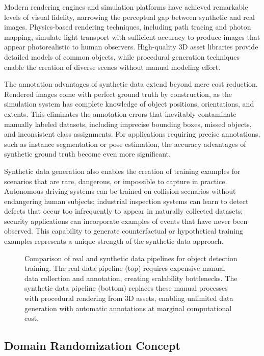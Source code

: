 Modern rendering engines and simulation platforms have achieved remarkable levels of visual fidelity, narrowing the perceptual gap between synthetic and real images. Physics-based rendering techniques, including path tracing and photon mapping, simulate light transport with sufficient accuracy to produce images that appear photorealistic to human observers. High-quality 3D asset libraries provide detailed models of common objects, while procedural generation techniques enable the creation of diverse scenes without manual modeling effort.

The annotation advantages of synthetic data extend beyond mere cost reduction. Rendered images come with perfect ground truth by construction, as the simulation system has complete knowledge of object positions, orientations, and extents. This eliminates the annotation errors that inevitably contaminate manually labeled datasets, including imprecise bounding boxes, missed objects, and inconsistent class assignments. For applications requiring precise annotations, such as instance segmentation or pose estimation, the accuracy advantages of synthetic ground truth become even more significant.

Synthetic data generation also enables the creation of training examples for scenarios that are rare, dangerous, or impossible to capture in practice. Autonomous driving systems can be trained on collision scenarios without endangering human subjects; industrial inspection systems can learn to detect defects that occur too infrequently to appear in naturally collected datasets; security applications can incorporate examples of events that have never been observed. This capability to generate counterfactual or hypothetical training examples represents a unique strength of the synthetic data approach.

\begin{figure}[t]
\centering
\resizebox{\textwidth}{!}{}
\caption{Comparison of real and synthetic data pipelines for object detection training. The real data pipeline (top) requires expensive manual data collection and annotation, creating scalability bottlenecks. The synthetic data pipeline (bottom) replaces these manual processes with procedural rendering from 3D assets, enabling unlimited data generation with automatic annotations at marginal computational cost.}
\label{fig:data_pipelines}
\end{figure}

\subsection{Domain Randomization Concept}
\label{subsec:domain_randomization}

